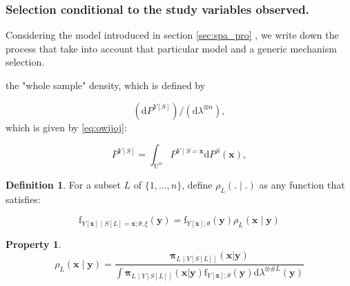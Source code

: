 \documentclass[12pt]{article}
\newtheorem{property}{Property}[section]
\theoremstyle{definition}
\newtheorem{definition}{Definition}[section]
\theoremstyle{remark}
\newcommand{\dominantY}{\lambda}
\newcommand{\sampledensity}{\mathbf{\pi}}
\newcommand{\parampop}{\theta}
\newcommand{\paramnuisance}{\xi}
\newcommand{\derive}{\mathrm{d}}
\newcommand{\density}{\mathrm{f}}
\newcommand{\Sample}{S}
\newcommand{\Pop}{\mathrm{U}}
\newcommand{\position}{\mathbf{x}}
\newcommand{\Sampleindex}{L}
\newcommand{\Signal}{Y}
\newcommand{\signal}{\mathbf{y}}
\begin{document}
\subsubsection{Selection conditional to the study variables observed.}

Considering the model introduced in section \ref{sec:spa_pro} , we write down the process that take into account that particular model and a generic mechanism selection.

the "whole sample" density, which is defined by


$$(\derive P^{\Signal[S]})/(\derive \dominantY^{\otimes n}),$$ which is given by \eqref{eq:owijoj}:

$$P^{\Signal[\Sample]}=\int_{\Pop^n} P^{\Signal\mid \Sample=\position}\derive P^\Sample(\position) ,$$


\begin{definition}
For a subset $\Sampleindex$ of $\{1,\ldots,n\}$,
define
$\rho_{\Sampleindex}(.\mid.)$ as any function that satisfies:

\begin{equation}
\density_{\Signal[\position]\mid\Sample[\Sampleindex]=\position ;\parampop,\paramnuisance}\left(\signal\right)=
    \density_{\Signal[\position];\parampop}\left(\signal\right)
    \rho_{\Sampleindex}\left(\position\mid  \signal\right)\label{eq:owijoj}
\end{equation}

\end{definition}


\begin{property}

\begin{equation}
\rho_{\Sampleindex}\left(\position \mid \signal\right)=
    \frac{\sampledensity_{\Sampleindex\mid \Signal[\Sample[\Sampleindex]]}\left(\position|\signal\right)}{\int
         \sampledensity_{\Sampleindex\mid \Signal[\Sample[\Sampleindex]]}\left(\position|\signal\right)
         \density_{\Signal[\position];\parampop}\left(\signal\right)
         \derive\dominantY^{\otimes\#\Sampleindex}\left(\signal\right)}
\end{equation}


\end{property}
\end{document}
